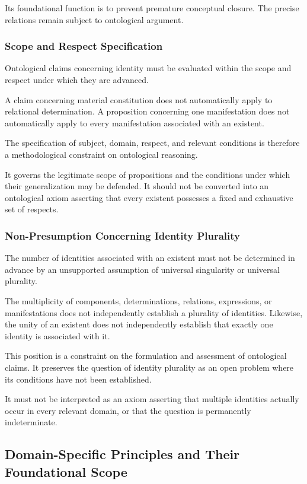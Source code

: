 Its foundational function is to prevent premature
conceptual closure. The precise relations remain
subject to ontological argument.

\subsubsection{Scope and Respect Specification}

Ontological claims concerning identity must be evaluated
within the scope and respect under which they are
advanced.

A claim concerning material constitution does not
automatically apply to relational determination.
A proposition concerning one manifestation does not
automatically apply to every manifestation associated
with an existent.

The specification of subject, domain, respect, and
relevant conditions is therefore a methodological
constraint on ontological reasoning.

It governs the legitimate scope of propositions and
the conditions under which their generalization may
be defended. It should not be converted into an
ontological axiom asserting that every existent
possesses a fixed and exhaustive set of respects.

\subsubsection{Non-Presumption Concerning Identity Plurality}

The number of identities associated with an existent
must not be determined in advance by an unsupported
assumption of universal singularity or universal plurality.

The multiplicity of components, determinations,
relations, expressions, or manifestations does not
independently establish a plurality of identities.
Likewise, the unity of an existent does not independently
establish that exactly one identity is associated
with it.

This position is a constraint on the formulation
and assessment of ontological claims. It preserves
the question of identity plurality as an open problem
where its conditions have not been established.

It must not be interpreted as an axiom asserting
that multiple identities actually occur in every
relevant domain, or that the question is permanently
indeterminate.

\subsection{Domain-Specific Principles and Their Foundational Scope}

